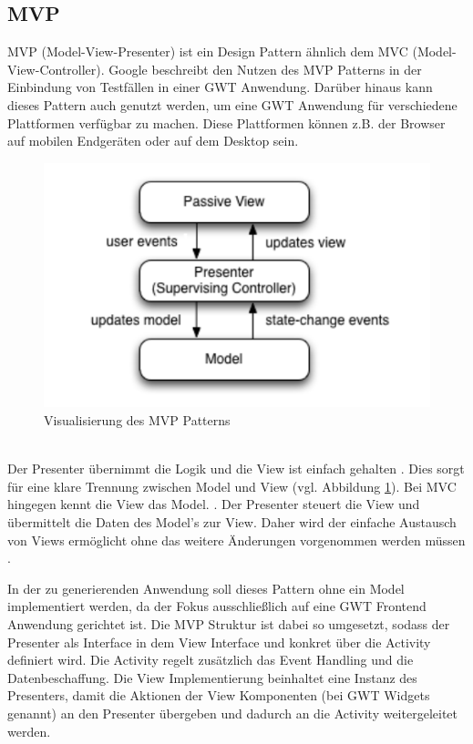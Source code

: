 \subsection{MVP}
\label{MVP}
MVP (Model-View-Presenter) ist ein Design Pattern ähnlich dem MVC
(Model-View-Controller). Google beschreibt den Nutzen des MVP Patterns in der
Einbindung von Testfällen in einer GWT Anwendung. Darüber hinaus kann dieses
Pattern auch genutzt werden, um eine GWT Anwendung für verschiedene Plattformen
verfügbar zu machen. Diese Plattformen können z.B. der Browser auf mobilen
Endgeräten oder auf dem Desktop sein.
\begin{figure}[htbp]
\begin{center}
\includegraphics{./img/MVP.pdf}
\caption{Visualisierung des MVP Patterns \cite{bib:MVP1}}\label{Fig:MVP}
\end{center}
\end{figure}\\
Der Presenter übernimmt die Logik und die View ist einfach gehalten
\cite{bib:MVP2}. Dies sorgt für eine klare Trennung zwischen Model und View (vgl.
Abbildung \ref{Fig:MVP}). Bei MVC hingegen kennt die View das Model.
\cite{bib:MVCvsMVP}. Der Presenter steuert die View und übermittelt die Daten
des Model's zur View.
Daher wird der einfache Austausch von Views ermöglicht ohne das weitere
Änderungen vorgenommen werden müssen \cite{bib:MVP1}\cite{bib:MVP2}.

In der zu generierenden Anwendung soll dieses Pattern ohne ein Model
implementiert werden, da der Fokus ausschließlich auf eine GWT Frontend
Anwendung gerichtet ist. Die MVP Struktur ist dabei so umgesetzt, sodass der
Presenter als Interface in dem View Interface und konkret über die Activity
definiert wird. Die Activity regelt zusätzlich das Event Handling und die
Datenbeschaffung. Die View Implementierung beinhaltet eine
Instanz des Presenters, damit die Aktionen der View Komponenten
(bei GWT Widgets genannt) an den Presenter übergeben und dadurch an die
Activity weitergeleitet werden.
